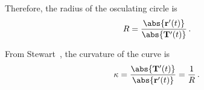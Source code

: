 \documentclass[12pt]{amsart}
\newcommand{\vect}{\mathbf}
\begin{document}
    Therefore, the radius of the osculating circle is
    \begin{equation*}
        R = \frac{\abs{ \vect{r}'(t)}}{\abs{\vect{T}'(t)}}\,.
    \end{equation*}

    From Stewart~\cite{Stewart2015}, the curvature of the curve is
    \begin{equation*}
        \kappa = \frac{\abs{\vect{T}'(t)}}{\abs{ \vect{r}'(t)}} = \frac{1}{R} \,.
    \end{equation*}
     
    






\printbibliography 
%
%
\end{document}
